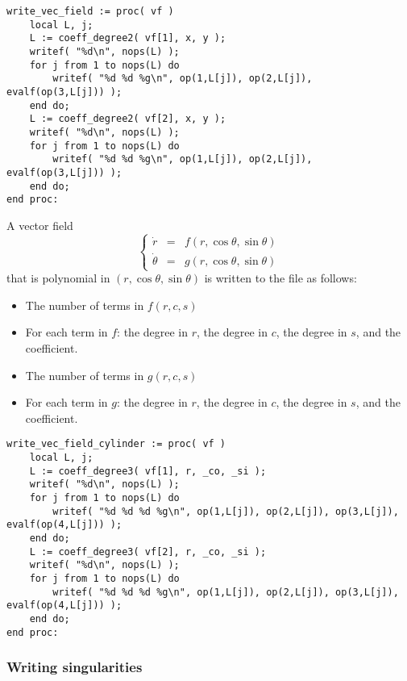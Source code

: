 \documentclass[a4paper,10pt]{article}
\begin{document}
\begin{lstlisting}[name=writelog]
write_vec_field := proc( vf )
    local L, j;
    L := coeff_degree2( vf[1], x, y );
    writef( "%d\n", nops(L) );
    for j from 1 to nops(L) do
        writef( "%d %d %g\n", op(1,L[j]), op(2,L[j]), evalf(op(3,L[j])) );
    end do;
    L := coeff_degree2( vf[2], x, y );
    writef( "%d\n", nops(L) );
    for j from 1 to nops(L) do
        writef( "%d %d %g\n", op(1,L[j]), op(2,L[j]), evalf(op(3,L[j])) );
    end do;
end proc:
\end{lstlisting}

A vector field
\[
    \left\{\begin{array}{rcl}
        \dot{r} & = & f(r,\cos\theta,\sin\theta)    \\
        \dot{\theta} & =& g(r,\cos\theta,\sin\theta)
    \end{array}\right.
\]
that is polynomial in $(r,\cos\theta,\sin\theta)$ is written to the file as follows:
\begin{itemize}
\item
    The number of terms in $f(r,c,s)$
\item
    For each term in $f$: the degree in $r$, the degree in $c$, the degree in $s$, and the coefficient.
\item
    The number of terms in $g(r,c,s)$
\item
    For each term in $g$: the degree in $r$, the degree in $c$, the degree in $s$, and the coefficient.
\end{itemize}

\begin{lstlisting}[name=writelog]
write_vec_field_cylinder := proc( vf )
    local L, j;
    L := coeff_degree3( vf[1], r, _co, _si );
    writef( "%d\n", nops(L) );
    for j from 1 to nops(L) do
        writef( "%d %d %d %g\n", op(1,L[j]), op(2,L[j]), op(3,L[j]), evalf(op(4,L[j])) );
    end do;
    L := coeff_degree3( vf[2], r, _co, _si );
    writef( "%d\n", nops(L) );
    for j from 1 to nops(L) do
        writef( "%d %d %d %g\n", op(1,L[j]), op(2,L[j]), op(3,L[j]), evalf(op(4,L[j])) );
    end do;
end proc:
\end{lstlisting}

\subsubsection{Writing singularities}
\end{document}
